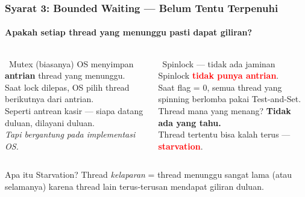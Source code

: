 \documentclass[t,aspectratio=169,xcolor=dvipsnames]{beamer}
\newcommand{\tem}[1]{\textbf{\textcolor{red}{#1}}}
\begin{document}
\begin{frame}[shrink=8]
    \frametitle{Syarat 3: Bounded Waiting — Belum Tentu Terpenuhi}
    \framesubtitle{Apakah setiap thread yang menunggu pasti dapat giliran?}
    \footnotesize

    \begin{columns}[T]
        \begin{exampleblock}{\checkmark\ Mutex (biasanya)}
            OS menyimpan \textbf{antrian} thread yang menunggu.\\
            Saat lock dilepas, OS pilih thread berikutnya dari antrian.\\[0.3em]
            Seperti antrean kasir — siapa datang duluan, dilayani duluan.\\[0.3em]
            \textit{Tapi bergantung pada implementasi OS.}
        \end{exampleblock}

        \begin{alertblock}{\texttimes\ Spinlock — tidak ada jaminan}
            Spinlock \tem{tidak punya antrian}.\\
            Saat flag = 0, semua thread yang spinning berlomba pakai Test-and-Set.\\[0.3em]
            Thread mana yang menang? \textbf{Tidak ada yang tahu.}\\[0.3em]
            Thread tertentu bisa kalah terus — \tem{starvation}.
        \end{alertblock}
    \end{columns}

    \begin{block}{Apa itu Starvation?}
        \centering
        Thread \textit{kelaparan} = thread menunggu sangat lama (atau selamanya) karena thread lain terus-terusan mendapat giliran duluan.
    \end{block}
\end{frame}
\end{document}
